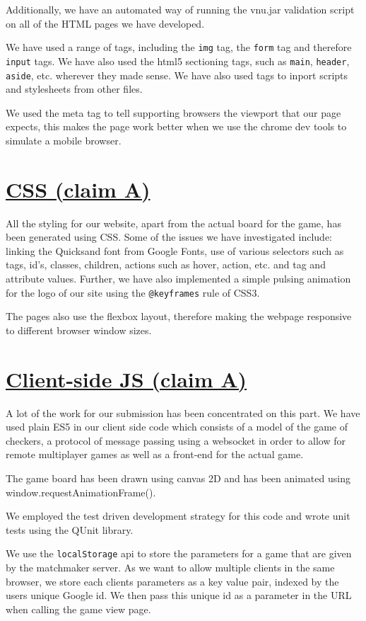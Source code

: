 \documentclass{article}
\begin{document}
    \indent Additionally, we have an automated way of running the vnu.jar validation script on all of the HTML pages we have developed.

    \indent We have used a range of tags, including the \verb|img| tag, the \verb|form| tag and therefore \verb|input| tags. We have also used the
    html5 sectioning tags, such as \verb|main|, \verb|header|, \verb|aside|, etc. wherever they made sense. We have also used tags to inport scripts
    and stylesheets from other files.

    \indent We used the meta tag to tell supporting browsers the viewport that our page expects, this makes the page work better when we use the chrome
    dev tools to simulate a mobile browser.
\section{\underline{CSS (claim A)}}\label{sec:CSS}
    All the styling for our website, apart from the actual board for the game, has been generated using CSS. Some of the issues we have
    investigated include: linking the Quicksand font from Google Fonts, use of various selectors such as tags, id's, classes, children,
    actions such as hover, action, etc. and tag and attribute values. Further, we have also implemented a simple pulsing animation for the logo
    of our site using the \verb|@keyframes| rule of CSS3.

    \indent The pages also use the flexbox layout, therefore making the webpage responsive to different browser window sizes.
\section{\underline{Client-side JS (claim A)}}\label{sec:clientJS}
    A lot of the work for our submission has been concentrated on this part. We have used plain ES5 in our client side code which consists of a model of the game of checkers,
    a protocol of message passing using a websocket in order to allow for remote multiplayer games as well as a front-end for the actual game.

    \indent The game board has been drawn using canvas 2D and has been animated using window.requestAnimationFrame().

    \indent We employed the test driven development strategy for this code and wrote unit tests using the QUnit library.

    \indent We use the \verb|localStorage| api to store the parameters for a game that are given by the matchmaker server. As we want to allow multiple clients in the same browser,
    we store each clients parameters as a key value pair, indexed by the users unique Google id. We then pass this unique id as a parameter in the URL when calling the game view page.
\end{document}
